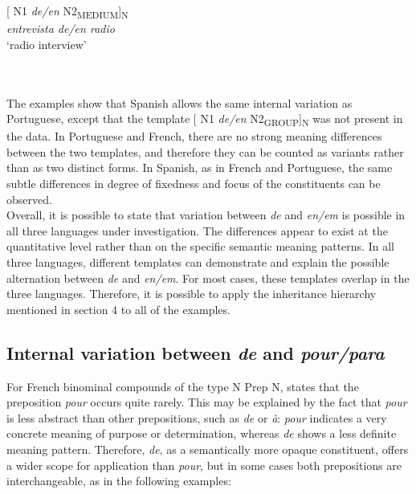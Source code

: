 \documentclass[output=paper]{langsci/langscibook}
\begin{document}
\begin{minipage}{0.4\textwidth}
[ N1 \textit{de/en} N2\textsubscript{MEDIUM}]\textsubscript{N}\\
\textit{entrevista de/en radio}\\
`radio interview'
\end{minipage} \\
\hfill
\\

The examples show that Spanish allows the same internal variation as Portuguese, except that the template [ N1 \textit{de/en} N2\textsubscript{GROUP}]\textsubscript{N} was not present in the data. In Portuguese and French, there are no strong meaning differences between the two templates, and therefore they can be counted as variants rather than as two distinct forms. In Spanish, as in French and Portuguese, the same subtle differences in degree of fixedness and focus of the constituents can be observed. \\

Overall, it is possible to state that variation between \textit{de} and \textit{en/em} is possible in all three languages under investigation. The differences appear to exist at the quantitative level rather than on the specific semantic meaning patterns. In all three languages, different templates can demonstrate and explain the possible alternation between \textit{de} and \textit{en/em}. For most cases, these templates overlap in the three languages. Therefore, it is possible to apply the inheritance hierarchy mentioned in section 4 to all of the examples.

 \subsection{Internal variation between \textit{de} and \textit{pour/para}}
 
 For French binominal compounds of the type N Prep N, \citet{Laumann:1998} states that the preposition \textit{pour} occurs quite rarely. This may be explained by the fact that \textit{pour} is less abstract than other prepositions, such as \textit{de} or \textit{à}: \textit{pour }indicates a very concrete meaning of purpose or determination, whereas \textit{de} shows a less definite meaning pattern. Therefore, \textit{de}, as a semantically more opaque constituent, offers a wider scope for application than \textit{pour}, but in some cases both prepositions are interchangeable, as in the following examples:\\
\end{document}
